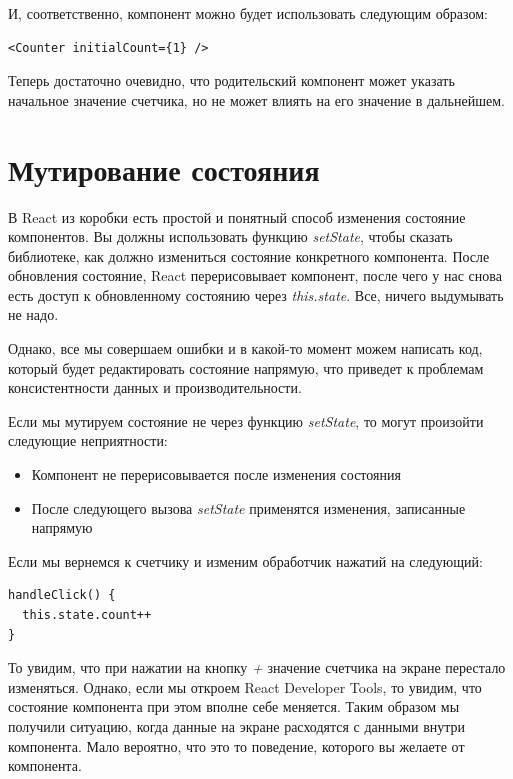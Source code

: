 И, соответственно, компонент можно будет использовать следующим образом:

\begin{lstlisting}
<Counter initialCount={1} />
\end{lstlisting}

Теперь достаточно очевидно, что родительский компонент может указать начальное значение счетчика, но не может влиять на его значение в дальнейшем.

\section{Мутирование состояния}

В React из коробки есть простой и понятный способ изменения состояние компонентов. Вы должны использовать функцию \textit{setState}, чтобы сказать библиотеке, как должно измениться состояние конкретного компонента. После обновления состояние, React перерисовывает компонент, после чего у нас снова есть доступ к обновленному состоянию через \textit{this.state}. Все, ничего выдумывать не надо.

Однако, все мы совершаем ошибки и в какой-то момент можем написать код, который будет редактировать состояние напрямую, что приведет к проблемам консистентности данных и производительности.

Если мы мутируем состояние не через функцию \textit{setState}, то могут произойти следующие неприятности:

\begin{itemize}
  \item Компонент не перерисовывается после изменения состояния
  \item После следующего вызова \textit{setState} применятся изменения, записанные напрямую
\end{itemize}

Если мы вернемся к счетчику и изменим обработчик нажатий на следующий:

\begin{lstlisting}
handleClick() {
  this.state.count++
}
\end{lstlisting}

То увидим, что при нажатии на кнопку \textit{+} значение счетчика на экране перестало изменяться. Однако, если мы откроем React Developer Tools, то увидим, что состояние компонента при этом вполне себе меняется. Таким образом мы получили ситуацию, когда данные на экране расходятся с данными внутри компонента. Мало вероятно, что это то поведение, которого вы желаете от компонента.

